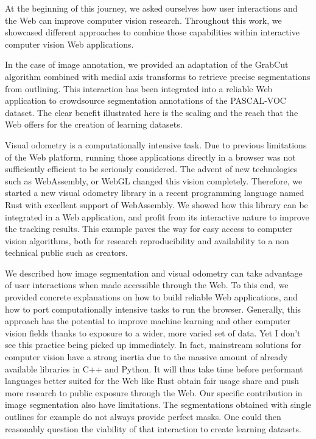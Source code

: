 At the beginning of this journey, we asked ourselves
how user interactions and the Web can improve computer vision research.
Throughout this work, we showcased different approaches to combine those capabilities
within interactive computer vision Web applications.

In the case of image annotation, we provided an adaptation of the GrabCut algorithm
combined with medial axis transforms to retrieve precise segmentations from outlining.
This interaction has been integrated into a reliable Web application
to crowdsource segmentation annotations of the PASCAL-VOC dataset.
The clear benefit illustrated here is the scaling and the reach that the Web
offers for the creation of learning datasets.

Visual odometry is a computationally intensive task.
Due to previous limitations of the Web platform, running those applications directly
in a browser was not sufficiently efficient to be seriously considered.
The advent of new technologies such as WebAssembly, or WebGL changed this vision completely.
Therefore, we started a new visual odometry library in a recent programming
language named Rust with excellent support of WebAssembly.
We showed how this library can be integrated in a Web application,
and profit from its interactive nature to improve the tracking results.
This example paves the way for easy access to computer vision algorithms,
both for research reproducibility and availability to a non technical public
such as creators.

We described how image segmentation and visual odometry can take advantage
of user interactions when made accessible through the Web.
To this end, we provided concrete explanations on how to build reliable Web applications,
and how to port computationally intensive tasks to run the browser.
Generally, this approach has the potential to improve machine learning
and other computer vision fields thanks to exposure to a wider,
more varied set of data.
Yet I don't see this practice being picked up immediately.
In fact, mainstream solutions for computer vision have a strong inertia
due to the massive amount of already available libraries in C++ and Python.
It will thus take time before performant languages better suited for the Web like Rust
obtain fair usage share and push more research to public exposure through the Web.
Our specific contribution in image segmentation also have limitations.
The segmentations obtained with single outlines for example do not always
provide perfect masks. One could then reasonably question the viability of that interaction
to create learning datasets.

